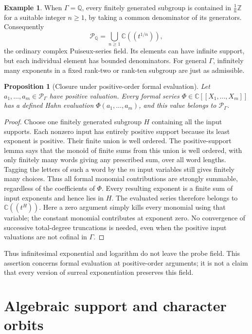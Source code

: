 \documentclass[11pt,oneside]{article}
\newtheorem{proposition}[theorem]{Proposition}
\theoremstyle{definition}
\newtheorem{example}[theorem]{Example}
\theoremstyle{remark}
\newcommand{\C}{\mathbb C}
\newcommand{\Q}{\mathbb Q}
\newcommand{\Z}{\mathbb Z}
\newcommand{\Pfield}{\mathscr P_\Gamma}
\begin{document}
\begin{example}\label{hnd:ex:puiseux}
When $\Gamma=\Q$, every finitely generated subgroup is contained in
$\frac1n\Z$ for a suitable integer $n\ge1$, by taking a common
denominator of its generators.
Consequently
\[
 \mathscr P_\Q=\bigcup_{n\ge1}\C((t^{1/n})),
\]
the ordinary complex Puiseux-series field. Its elements can have infinite
support, but each individual element has bounded denominators.
For general $\Gamma$, infinitely many exponents in a fixed rank-two or
rank-ten subgroup are just as admissible.
\end{example}

\begin{proposition}[Closure under positive-order formal evaluation]
\label{hnd:prop:evaluation}
Let $a_1,\ldots,a_m\in\Pfield$ have positive valuation. Every formal
series $\Phi\in\C[[X_1,\ldots,X_m]]$ has a defined Hahn evaluation
$\Phi(a_1,\ldots,a_m)$, and this value belongs to $\Pfield$.
\end{proposition}
\begin{proof}
Choose one finitely generated subgroup $H$ containing all the input
supports. Each nonzero input has entirely positive support because
its least exponent is positive. Their finite union is well ordered.
The positive-support lemma says that the monoid of finite sums from
this union is well ordered, with only finitely many words giving any
prescribed sum, over all word lengths. Tagging the
letters of such a word by the $m$ input variables still gives finitely
many choices. Thus all formal monomial contributions are strongly
summable, regardless of the coefficients of $\Phi$. Every resulting
exponent is a finite sum of input exponents and hence lies in $H$.
The evaluated series therefore belongs to $\C((t^H))$.
Here a zero argument simply kills every monomial using that variable;
the constant monomial contributes at exponent zero. No convergence of
successive total-degree truncations is needed, even when the positive
input valuations are not cofinal in $\Gamma$.
\end{proof}

Thus infinitesimal exponential and logarithm do not leave the probe
field. This assertion concerns formal evaluation at positive-order
arguments; it is not a claim that every version of surreal exponentiation
preserves this field.

\section{Algebraic support and character orbits}\label{hnd:sec:characters}
\end{document}

